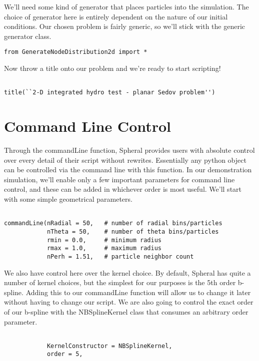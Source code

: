 \documentclass[11pt]{memoir}
\begin{document}
We'll need some kind of generator that places particles into the simulation. The choice of generator here is entirely dependent on the nature of our initial conditions. Our chosen problem is fairly generic, so we'll stick with the generic generator class.

\begin{lstlisting}[firstnumber=last]
from GenerateNodeDistribution2d import *
\end{lstlisting}

Now throw a title onto our problem and we're ready to start scripting!

\begin{lstlisting}[firstnumber=last]

title(``2-D integrated hydro test - planar Sedov problem'')
\end{lstlisting}

\section{Command Line Control}

Through the commandLine function, Spheral provides users with absolute control over every detail of their script without rewrites. Essentially any python object can be controlled via the command line with this function. In our demonstration simulation, we'll enable only a few important parameters for command line control, and these can be added in whichever order is most useful. We'll start with some simple geometrical parameters.

\begin{lstlisting}[firstnumber=last]

commandLine(nRadial = 50,	# number of radial bins/particles
			nTheta = 50,	# number of theta bins/particles
			rmin = 0.0,		# minimum radius
			rmax = 1.0,		# maximum radius
			nPerh = 1.51,	# particle neighbor count
\end{lstlisting}

We also have control here over the kernel choice. By default, Spheral has quite a number of kernel choices, but the simplest for our purposes is the 5th order b-spline. Adding this to our commandLine function will allow us to change it later without having to change our script. We are also going to control the exact order of our b-spline with the NBSplineKernel class that consumes an arbitrary order parameter.

\begin{lstlisting}[firstnumber=last]

			KernelConstructor = NBSplineKernel,
			order = 5,
\end{lstlisting}
\end{document}
